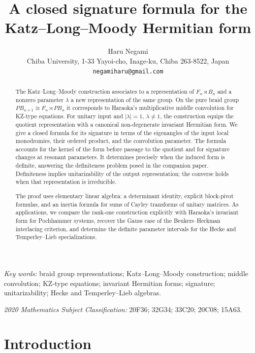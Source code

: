 \documentclass[11pt]{article}
\title{%
A closed signature formula for the Katz--Long--Moody Hermitian form%
}
\author{Haru Negami\\[2pt]
\small Chiba University, 1-33 Yayoi-cho, Inage-ku, Chiba 263-8522, Japan\\
\small \texttt{negamiharu@gmail.com}}
\date{}
\theoremstyle{definition}
\newcommand{\PB}{\mathit{PB}}            %
\begin{document}
\maketitle

\begin{abstract}
The Katz--Long--Moody construction associates to a representation
of $F_n\rtimes B_n$ and a nonzero parameter $\lambda$ a new
representation of the same group. On the pure braid group
$\PB_{n+1}\cong F_n\rtimes\PB_n$ it corresponds to Haraoka's
multiplicative middle convolution for KZ-type equations. For unitary input and $|\lambda|=1$,
$\lambda\ne1$, the construction equips the quotient representation
with a canonical non-degenerate invariant Hermitian form.
We give a closed formula for its signature in terms of the
eigenangles of the input local monodromies, their ordered product,
and the convolution parameter. The formula accounts for the
kernel of the form before passage to the quotient and for
signature changes at resonant parameters. It determines precisely
when the induced form is definite, answering the definiteness
problem posed in the companion paper. Definiteness implies
unitarizability of the output representation; the converse holds
when that representation is irreducible.

The proof uses elementary linear algebra: a determinant identity,
explicit block-pivot formulas, and an inertia formula for sums
of Cayley transforms of unitary matrices. As applications,
we compare the rank-one construction explicitly with Haraoka's
invariant form for Pochhammer systems, recover the Gauss case
of the Beukers--Heckman interlacing criterion, and determine
the definite parameter intervals for the Hecke and
Temperley--Lieb specializations.
\end{abstract}

\medskip\noindent
\textit{Key words:} braid group representations; Katz--Long--Moody
construction; middle convolution; KZ-type equations; invariant
Hermitian forms; signature; unitarizability; Hecke and
Temperley--Lieb algebras.

\medskip\noindent
\textit{2020 Mathematics Subject Classification:} 20F36; 32G34;
33C20; 20C08; 15A63.

\section{Introduction}\label{sec:intro}
\end{document}
